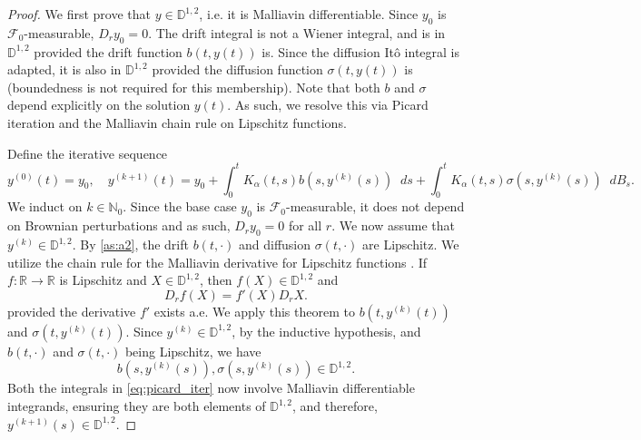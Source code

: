 \documentclass[11pt, a4paper]{article}
\theoremstyle{theoremstyle}
\theoremstyle{definitionstyle}
\newcommand{\dd}{\mathop{}\!d}
\begin{document}
\begin{proof}
    We first prove that $y \in \mathbb D^{1, 2}$, i.e. it is Malliavin differentiable. Since $y_0$ is $\mathcal F_0$-measurable, $D_r y_0 = 0$. The drift integral is not a Wiener integral, and is in $\mathbb D^{1, 2}$ provided the drift function $b(t, y(t))$ is. Since the diffusion It\^o integral is adapted, it is also in $\mathbb D^{1, 2}$ provided the diffusion function $\sigma(t, y(t))$ is (boundedness is not required for this membership). Note that both $b$ and $\sigma$ depend explicitly on the solution $y(t)$. As such, we resolve this via Picard iteration and the Malliavin chain rule on Lipschitz functions.

    Define the iterative sequence
    \begin{equation}\label{eq:picard_iter}
        y^{(0)}(t) = y_0, \quad y^{(k+1)}(t) = y_0 + \int_0^t K_{\alpha}(t, s)b(s, y^{(k)}(s))\dd{s} + \int_0^t K_\alpha(t, s)\sigma(s, y^{(k)}(s))\dd{B_s}.
    \end{equation}
    We induct on $k \in \mathbb N_0$. Since the base case $y_0$ is $\mathcal F_0$-measurable, it does not depend on Brownian perturbations and as such, $D_ry_0 = 0$ for all $r$. We now assume that $y^{(k)} \in \mathbb D^{1, 2}$. By \ref{as:a2}, the drift $b(t, \cdot)$ and diffusion $\sigma(t, \cdot)$ are Lipschitz. We utilize the chain rule for the Malliavin derivative for Lipschitz functions \cite{nualart2006malliavin}. If $f : \mathbb R \to \mathbb R$ is Lipschitz and $X \in \mathbb D^{1, 2}$, then $f(X) \in \mathbb D^{1, 2}$ and
    \begin{equation}
        D_r f(X) = f'(X)D_rX.
    \end{equation}
    provided the derivative $f'$ exists a.e. We apply this theorem to $b(t, y^{(k)}(t))$ and $\sigma(t, y^{(k)}(t))$. Since $y^{(k)} \in \mathbb D^{1, 2}$, by the inductive hypothesis, and $b(t, \cdot)$ and $\sigma(t, \cdot)$ being Lipschitz, we have
    \begin{equation}
        b(s, y^{(k)}(s)), \sigma(s, y^{(k)}(s)) \in \mathbb D^{1, 2}.
    \end{equation}
    Both the integrals in \eqref{eq:picard_iter} now involve Malliavin differentiable integrands, ensuring they are both elements of $\mathbb D^{1, 2}$, and therefore,
    $y^{(k+1)}(s) \in \mathbb D^{1, 2}.$

\end{proof}
\end{document}
